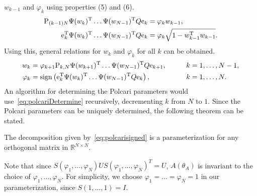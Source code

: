 \documentclass[12pt]{article}
\begin{document}
$w_{k-1}$ and $\varphi_k$ using properties (5) and (6).
\begin{align*}
  {\rm P}_{(k-1)N} \Psi(w_{k})^{\rm T} \dots \Psi(w_{N-1})^{\rm T} Q {\rm e}_k
  &= \varphi_k w_{k-1}, \\
  {\rm e}_k^{\rm T} \Psi(w_{k})^{\rm T} \dots \Psi(w_{N-1})^{\rm T} Q {\rm e}_k
  &= \varphi_k \sqrt{1 - w_{k-1}^{\rm T} w_{k-1}}.
\end{align*}
%
Using this, general relations for $w_k$ and $\varphi_k$ for all $k$ can be obtained.
\bse
\begin{alignat}{2}
  w_{k} &= \varphi_{k+1} {\rm P}_{k,N} \Psi(w_{k+1})^{\rm T} \dots \Psi(w_{N-1})^{\rm T} Q {\rm e}_{k+1},
            \qquad &&k=1, \dots, N-1,\\
  \varphi_k &= {\rm sign}\left({\rm e}_k^{\rm T} \Psi(w_{k})^{\rm T} \dots \Psi(w_{N-1})^{\rm T} Q {\rm e}_k\right) ,
              \qquad &&k=1, \dots, N.
\end{alignat}\label{eq:polcariDetermine}
\ese
%
An algorithm for determining the Polcari parameters would use~\eqref{eq:polcariDetermine}
recursively, decrementing $k$ from $N$ to $1$.
Since the Polcari parameters can be uniquely determined, the following theorem can be stated.

{\theorem The decomposition given by~\eqref{eq:polcarisigned}
  is a parameterization for any orthogonal matrix in $\mathbb{R}^{N \times N}$.
}

\medskip

Note that since $S(\varphi_1, \dots, \varphi_N) U S(\varphi_1, \dots, \varphi_N)^T = U$,
$A(\theta_A)$ is invariant to the choice of $\varphi_1, \dots, \varphi_N$.
For simplicity, we choose $\varphi_1 = \dots = \varphi_N = 1$ in our parameterization,
since $S(1, \dots, 1) = I$.



\end{document}
